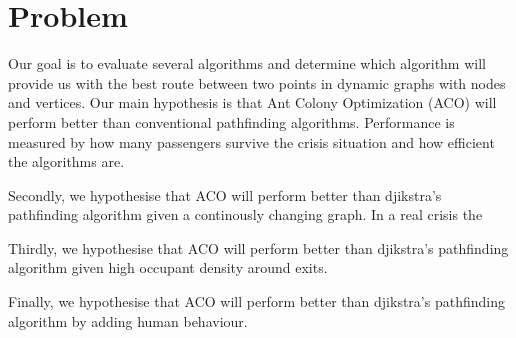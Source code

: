 \chapter{Problem}
\label{ch:problem}


Our goal is to evaluate several algorithms and determine which algorithm will provide us with the
best route between two points in dynamic graphs with nodes and vertices. Our main hypothesis
is that Ant Colony Optimization (ACO) will perform better than conventional pathfinding
algorithms. Performance is measured by how many passengers survive the crisis situation
and how efficient the algorithms are.

Secondly, we hypothesise that ACO will perform better than djikstra's pathfinding algorithm
given a continously changing graph. In a real crisis the

Thirdly, we hypothesise that ACO will perform better than djikstra's pathfinding algorithm
given high occupant density around exits.

Finally, we hypothesise that ACO will perform better than djikstra's pathfinding algorithm
by adding human behaviour.

